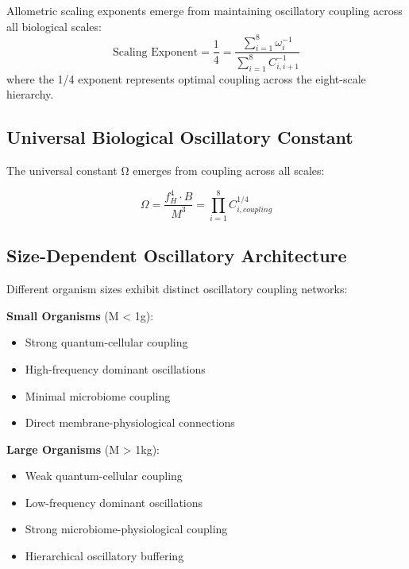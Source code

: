 \documentclass[twocolumn]{article}
\begin{document}
\begin{theorem}
Allometric scaling exponents emerge from maintaining oscillatory coupling across all biological scales:
\begin{equation}
\text{Scaling Exponent} = \frac{1}{4} = \frac{\sum_{i=1}^{8} \omega_i^{-1}}{\sum_{i=1}^{8} C_{i,i+1}^{-1}}
\end{equation}
where the 1/4 exponent represents optimal coupling across the eight-scale hierarchy.
\end{theorem}

\subsection{Universal Biological Oscillatory Constant}

The universal constant Ω emerges from coupling across all scales:

\begin{equation}
\Omega = \frac{f_H^4 \cdot B}{M^3} = \prod_{i=1}^{8} C_{i,coupling}^{1/4}
\end{equation}

\subsection{Size-Dependent Oscillatory Architecture}

Different organism sizes exhibit distinct oscillatory coupling networks:

\begin{definition}
\textbf{Small Organisms} (M < 1g):
\begin{itemize}
\item Strong quantum-cellular coupling
\item High-frequency dominant oscillations
\item Minimal microbiome coupling
\item Direct membrane-physiological connections
\end{itemize}

\textbf{Large Organisms} (M > 1kg):
\begin{itemize}
\item Weak quantum-cellular coupling
\item Low-frequency dominant oscillations
\item Strong microbiome-physiological coupling
\item Hierarchical oscillatory buffering
\end{itemize}
\end{definition}
\end{document}
